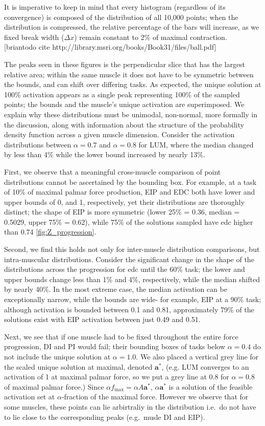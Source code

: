 It is imperative to keep in mind that every histogram (regardless of its convergence) is composed of the distribution of all 10,000 points; when the distribution is compressed, the relative percentage of the bars will increase, as we fixed break width ($\Delta x$) remain constant to 2\% of maximal contraction. [briantodo cite http://library.msri.org/books/Book31/files/ball.pdf]

The peaks seen in these figures is the perpendicular slice that has the largest relative area; within the same muscle it does not have to be symmetric between the bounds, and can shift over differing tasks.
As expected, the unique solution at 100\% activation appears as a single peak representing 100\% of the sampled points; the bounds and the muscle's unique activation are superimposed.
We explain why these distributions must be unimodal, non-normal, more formally in the discussion, along with information about the structure of the probability density function across a given muscle dimension.
Consider the activation distributions between $\alpha = 0.7$ and $\alpha = 0.8$ for LUM, where the median changed by less than 4\% while the lower bound increased by nearly 13\%.

First, we observe that a meaningful cross-muscle comparison of point distributions cannot be ascertained by the bounding box. For example, at a task of 10\% of maximal palmar force production, EIP and EDC both have lower and upper bounds of 0, and 1, respectively, yet their distributions are thoroughly distinct; the shape of EIP is more symmetric (lower 25\% = 0.36, median = 0.5029, upper 75\% = 0.62), while 75\% of the solutions sampled have edc higher than 0.74 \ref{fig:Z_progression}.

Second, we find this holds not only for inter-muscle distribution comparisons, but intra-muscular distributions. Consider the significant change in the shape of the distributions across the progression for edc until the 60\% task; the lower and upper bounds change less than 1\% and 4\%, respectively, while the median shifted by nearly 40\%.
In the most extreme case, the median activation can be exceptionally narrow, while the bounds are wide- for example, EIP at a 90\% task; although activation is bounded between 0.1 and 0.81, approximately 79\% of the solutions exist with EIP activation between just 0.49 and 0.51.

Next, we see that if one muscle had to be fixed throughout the entire force progression, DI and PI would fail; their bounding boxes of tasks below $\alpha=0.4$ do not include the unique solution at $\alpha=1.0$. We also placed a vertical grey line for the scaled unique solution at maximal, denoted $\textbf{a}^*$, (e.g. LUM converges to an activation of 1 at maximal palmar force, so we put a grey line at 0.8 for $\alpha=0.8$ of maximal palmar force.) Since $\alpha f_{\max} = \alpha A \textbf{a}^*$, $\alpha \textbf{a}^*$ is a solution of the feasible activation set at $\alpha$-fraction of the maximal force. However we observe that for some muscles, these points can lie arbirtraliy in the distribution i.e.\ do not have to lie close to the corresponding peaks (e.g.\ musle DI and EIP).

